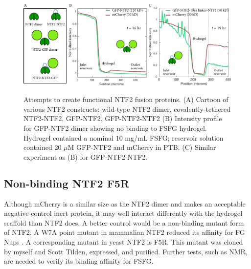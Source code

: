 \begin{figure} %
\caption[NTF2 fusion proteins.]{Attempts to create functional NTF2 fusion proteins. (A) Cartoon of various NTF2 constructs: wild-type NTF2 dimer, covalently-tethered NTF2-NTF2, GFP-NTF2, GFP-NTF2-NTF2 (B) Intensity profile for GFP-NTF2 dimer showing no binding to FSFG hydrogel.  Hydrogel contained a nominal 10 mg/mL FSFG; reservoir solution contained 20 $\mu$M GFP-NTF2 and mCherry in PTB.  (C) Similar experiment as (B) for GFP-NTF2-NTF2.}
\centering
\includegraphics[width=\textwidth]{figs/ch03/NTF2-constructs}
\label{fig:NTF2}
\end{figure}

\subsection{Non-binding NTF2 F5R}

Although mCherry is a similar size as the NTF2 dimer and makes an acceptable negative-control inert protein, it may well interact differently with the hydrogel scaffold than NTF2 does.  A better control would be a non-binding mutant form of NTF2.  A W7A point mutant in mammalian NTF2 reduced its affinity for FG Nups \cite{bayliss99,wagner15}.  A corresponding mutant in yeast NTF2 is F5R.  This mutant was cloned by myself and Scott Tilden, expressed, and purified. Further tests, such as NMR, are needed to verify its binding affinity for FSFG.

